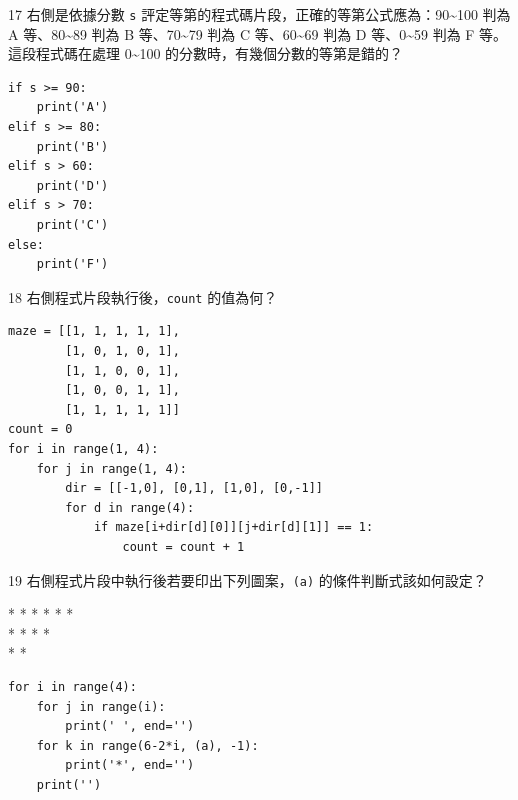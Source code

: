 \medskip

\begin{qbox}{17}
右側是依據分數 \texttt{s} 評定等第的程式碼片段，正確的等第公式應為：90\textasciitilde100 判為 A 等、80\textasciitilde89 判為 B 等、70\textasciitilde79 判為 C 等、60\textasciitilde69 判為 D 等、0\textasciitilde59 判為 F 等。這段程式碼在處理 0\textasciitilde100 的分數時，有幾個分數的等第是錯的？

\begin{verbatim}
if s >= 90:
    print('A')
elif s >= 80:
    print('B')
elif s > 60:
    print('D')
elif s > 70:
    print('C')
else:
    print('F')
\end{verbatim}

\end{qbox}

\medskip

\begin{qbox}{18}
右側程式片段執行後，\texttt{count} 的值為何？

\begin{verbatim}
maze = [[1, 1, 1, 1, 1],
        [1, 0, 1, 0, 1],
        [1, 1, 0, 0, 1],
        [1, 0, 0, 1, 1],
        [1, 1, 1, 1, 1]]
count = 0
for i in range(1, 4):
    for j in range(1, 4):
        dir = [[-1,0], [0,1], [1,0], [0,-1]]
        for d in range(4):
            if maze[i+dir[d][0]][j+dir[d][1]] == 1:
                count = count + 1
\end{verbatim}

\end{qbox}

\medskip

\begin{qbox}{19}
右側程式片段中執行後若要印出下列圖案，\texttt{(a)} 的條件判斷式該如何設定？

\begin{center}\ttfamily\small
* * * * * *\\
* * * *\\
* *
\end{center}

\begin{verbatim}
for i in range(4):
    for j in range(i):
        print(' ', end='')
    for k in range(6-2*i, (a), -1):
        print('*', end='')
    print('')
\end{verbatim}

\end{qbox}

